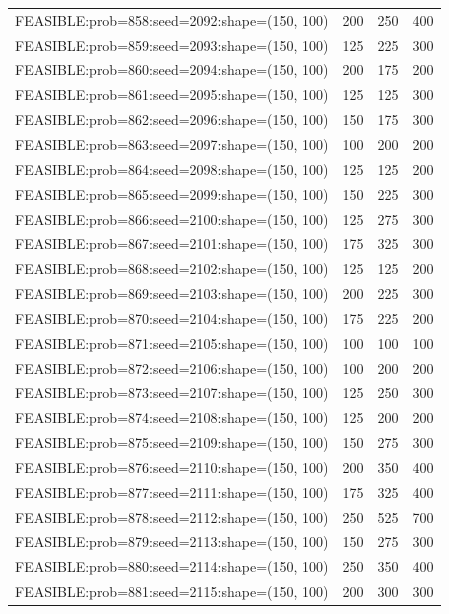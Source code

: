 \begin{longtable}{lccc}
FEASIBLE:prob=858:seed=2092:shape=(150, 100) &  200 &   250 &    400 \\
FEASIBLE:prob=859:seed=2093:shape=(150, 100) &  125 &   225 &    300 \\
FEASIBLE:prob=860:seed=2094:shape=(150, 100) &  200 &   175 &    200 \\
FEASIBLE:prob=861:seed=2095:shape=(150, 100) &  125 &   125 &    300 \\
FEASIBLE:prob=862:seed=2096:shape=(150, 100) &  150 &   175 &    300 \\
FEASIBLE:prob=863:seed=2097:shape=(150, 100) &  100 &   200 &    200 \\
FEASIBLE:prob=864:seed=2098:shape=(150, 100) &  125 &   125 &    200 \\
FEASIBLE:prob=865:seed=2099:shape=(150, 100) &  150 &   225 &    300 \\
FEASIBLE:prob=866:seed=2100:shape=(150, 100) &  125 &   275 &    300 \\
FEASIBLE:prob=867:seed=2101:shape=(150, 100) &  175 &   325 &    300 \\
FEASIBLE:prob=868:seed=2102:shape=(150, 100) &  125 &   125 &    200 \\
FEASIBLE:prob=869:seed=2103:shape=(150, 100) &  200 &   225 &    300 \\
FEASIBLE:prob=870:seed=2104:shape=(150, 100) &  175 &   225 &    200 \\
FEASIBLE:prob=871:seed=2105:shape=(150, 100) &  100 &   100 &    100 \\
FEASIBLE:prob=872:seed=2106:shape=(150, 100) &  100 &   200 &    200 \\
FEASIBLE:prob=873:seed=2107:shape=(150, 100) &  125 &   250 &    300 \\
FEASIBLE:prob=874:seed=2108:shape=(150, 100) &  125 &   200 &    200 \\
FEASIBLE:prob=875:seed=2109:shape=(150, 100) &  150 &   275 &    300 \\
FEASIBLE:prob=876:seed=2110:shape=(150, 100) &  200 &   350 &    400 \\
FEASIBLE:prob=877:seed=2111:shape=(150, 100) &  175 &   325 &    400 \\
FEASIBLE:prob=878:seed=2112:shape=(150, 100) &  250 &   525 &    700 \\
FEASIBLE:prob=879:seed=2113:shape=(150, 100) &  150 &   275 &    300 \\
FEASIBLE:prob=880:seed=2114:shape=(150, 100) &  250 &   350 &    400 \\
FEASIBLE:prob=881:seed=2115:shape=(150, 100) &  200 &   300 &    300 \\

\end{longtable}
